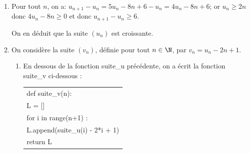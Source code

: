 \begin{enumerate}
\begin{enumerate}

On a donc démontré que, pour tout entier naturel $n$, on a: $u_n\geqslant 2n$.		
		
		\item%
$\ds\lim _{n\to +\infty} 2n=+\infty$ et $u_n\geqslant 2n$ donc $\ds\lim _{n\to +\infty} u_n = +\infty$.
		
		\item Soit $p \in \N^*$.%
		
$\ds\lim _{n\to +\infty} u_n = +\infty$ donc, d'après la définition de la limite vers $+\infty$ d'une suite, pour tout réel $A>0$, il existe un rang $n_0$ à partir duquel tous les termes de la suite sont supérieurs à $A$; donc il existe un rang $n_0$ tel que si $n\geqslant n_0$, alors $u_{n_0}\geqslant 10^p$.
\end{enumerate}

\item %
Pour tout $n$, on a:
$u_{n+1}-u_n=5u_n-8n+6 -u_n = 4u_n - 8n +6$;
or $u_n\geqslant 2n$ donc $4u_n-8n\geqslant 0$ et donc $u_{n+1}-u_n\geqslant 6$.

On en déduit que la suite $(u_n)$ est croissante.

\item On considère la suite $\left(v_n\right)$, définie pour tout $n \in  \N$, par $v_n = u_n - 2n + 1$.
	\begin{enumerate}
		\item En dessous de la fonction {\ttfamily suite\_u} précédente, on a écrit la fonction {\ttfamily suite\_v} ci-dessous :
\begin{center}
\begin{tabular}{>{\ttfamily}l}
def suite\_v(n):\\
\qquad L = []\\
\qquad  for i in range(n+1) :\\
\qquad \vline \qquad L.append(suite\_u(i) - 2*i + 1)\\
\qquad return L
\end{tabular}
\end{center}


\end{enumerate}
\end{enumerate}
